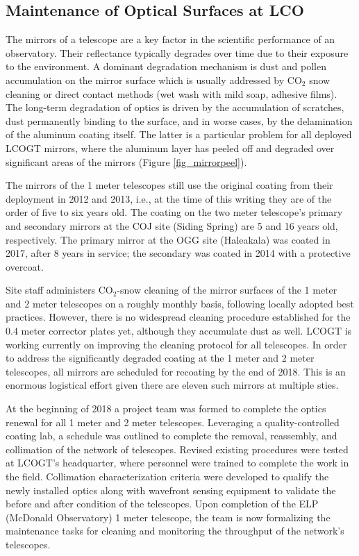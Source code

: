 \documentclass[]{spieman}
\begin{document}
\subsection{Maintenance of Optical Surfaces at LCO}


The mirrors of a telescope are a key factor in the  scientific performance of an observatory. Their
reflectance typically degrades over time due to their exposure to the environment. A dominant
degradation mechanism is dust and pollen accumulation on the mirror surface which is usually
addressed by CO$_2$ snow cleaning or direct contact methods (wet wash with mild soap, adhesive
films). The long-term degradation of optics is driven by the accumulation of scratches, dust
permanently binding to the surface, and in worse cases, by the delamination of the aluminum coating
itself. The latter is a particular problem for all deployed LCOGT mirrors, where the aluminum layer
has peeled off and degraded over significant areas of the mirrors (Figure \ref{fig_mirrorpeel}).

The mirrors of the 1 meter telescopes still use the original coating from their deployment in 2012
and 2013, i.e., at the time of this writing they are of the order of five to six years old. The
coating  on the two meter telescope's  primary and secondary mirrors at the COJ site (Siding
Spring) are 5  and 16 years old, respectively. The primary  mirror at the OGG site (Haleakala) was
coated in 2017, after 8 years in service; the secondary  was coated in 2014 with a protective
overcoat.

Site staff administers CO$_2$-snow cleaning of the mirror surfaces of the 1 meter and 2 meter
telescopes on a roughly monthly basis, following locally adopted best practices. However, there is
no widespread cleaning procedure established for the 0.4 meter corrector plates yet, although
they accumulate dust as well. LCOGT is working currently on improving the cleaning protocol for all
telescopes. In order to address the significantly degraded coating at the 1 meter and 2 meter
telescopes, all mirrors are scheduled for recoating by the end of 2018. This is an enormous
logistical effort given there are eleven such mirrors at multiple sties.

At the beginning of 2018 a project team was formed to complete the optics renewal for all 1 meter and
2 meter telescopes.  Leveraging a quality-controlled coating lab, a schedule was outlined to complete
the removal, reassembly, and collimation of the network of telescopes.  Revised 
existing procedures were tested at LCOGT's headquarter, where personnel were trained to complete the
work in the field.  Collimation characterization criteria were developed to qualify the newly
installed optics along with wavefront sensing equipment to validate the before and after condition
of the telescopes.  Upon completion of the ELP (McDonald Observatory) 1 meter telescope, the team 
is now formalizing the maintenance tasks for cleaning and monitoring the throughput of the network's 
telescopes.
\end{document}
